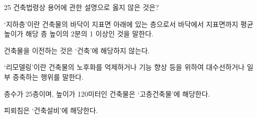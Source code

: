 \begin{question}{25}
건축법령상 용어에 관한 설명으로 옳지 않은 것은?
\begin{choices}
  \item ‘지하층’이란 건축물의 바닥이 지표면 아래에 있는 층으로서 바닥에서 지표면까지 평균높이가 해당 층 높이의 2분의 1 이상인 것을 말한다.
  \item 건축물을 이전하는 것은 ‘건축’에 해당하지 않는다.
  \item ‘리모델링’이란 건축물의 노후화를 억제하거나 기능 향상 등을 위하여 대수선하거나 일부 증축하는 행위를 말한다.
  \item 층수가 25층이며, 높이가 120미터인 건축물은 ‘고층건축물’에 해당한다.
  \item 피뢰침은 ‘건축설비’에 해당한다.
\end{choices}
\end{question}
